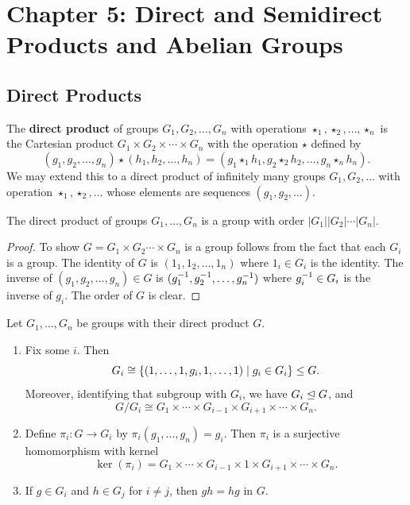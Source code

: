 \section{Chapter 5: Direct and Semidirect Products and Abelian Groups} \label{chap5}

\subsection{Direct Products} \label{sec5.1}

 The \textbf{direct product} of groups $G_1, G_2, \ldots, G_n$ with operations $\star_1, \star_2, \ldots, \star_n$ is the Cartesian product $G_1 \times G_2 \times \cdots \times G_n$ with the operation $\star$ defined by
\[(g_1, g_2, \ldots, g_n) \star (h_1, h_2, \ldots, h_n) = (g_1 \star_1 h_1, g_2 \star_2 h_2, \ldots, g_n \star_n h_n).\]
We may extend this to a direct product of infinitely many groups $G_1, G_2, \ldots$ with operation $\star_1, \star_2, \ldots$ whose elements are sequences $(g_1, g_2, \ldots)$.

 \label{prop5.1}
The direct product of groups $G_1, \ldots, G_n$ is a group with order $|G_1||G_2| \cdots |G_n|$.
\begin{proof}
    To show $G = G_1 \times G_2 \cdots \times G_n$ is a group follows from the fact that each $G_i$ is a group. The identity of $G$ is $(1_1, 1_2, \ldots, 1_n)$ where $1_i \in G_i$ is the identity. The inverse of $(g_1, g_2, \ldots, g_n) \in G$ is $(g_1^{-1}, g_2^{-1}, \ldots, g_n^{-1})$ where $g_i^{-1} \in G_i$ is the inverse of $g_i$. The order of $G$ is clear.
\end{proof}

 \label{prop5.2}
Let $G_1, \ldots, G_n$ be groups with their direct product $G$.
\begin{enumerate}
    \item Fix some $i$. Then
    \[G_i \cong \{(1, \ldots, 1, g_i, 1, \ldots, 1) \mid g_i \in G_i\} \leq G.\]
    Moreover, identifying that subgroup with $G_i$, we have $G_i \trianglelefteq G$, and
    \[G/G_i \cong G_1 \times \cdots \times G_{i-1} \times G_{i+1} \times \cdots \times G_n.\]
    \item Define $\pi_i : G \to G_i$ by $\pi_i(g_1, \ldots, g_n) = g_i$. Then $\pi_i$ is a surjective homomorphism with kernel
    \[\ker(\pi_i) = G_1 \times \cdots \times G_{i-1} \times 1 \times G_{i+1} \times \cdots \times G_n.\]
    \item If $g \in G_i$ and $h \in G_j$ for $i \neq j$, then $gh = hg$ in $G$.
\end{enumerate}


